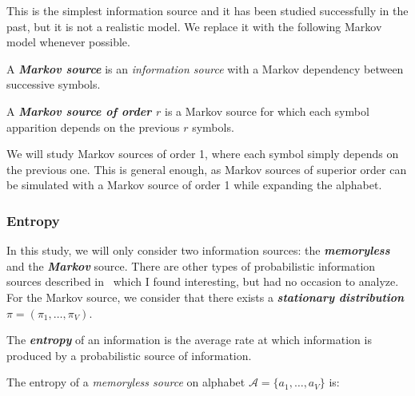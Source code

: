 \begin{rmk}
    \label{rmk:memoryless}
    This is the simplest information source and it has been 
    studied successfully in the past, but it is not a realistic 
    model. We replace it with the following Markov model whenever 
    possible.
\end{rmk}

\begin{df}
    \label{def:markov}
    A \emph{\bfseries Markov source} is an \emph{information source}
    with a Markov dependency between successive symbols.
\end{df}

\begin{df}
    \label{def:markovorder}
    A \emph{\bfseries Markov source of order $r$} is a Markov source
    for which each symbol apparition depends on the previous 
    $r$ symbols.
\end{df}

\begin{rmk}
    \label{rmk:markov2}
    We will study Markov sources of order 1, where each
    symbol simply depends on the previous one. This is 
    general enough, as Markov sources of superior order
    can be simulated with a Markov source of order 1 
    while expanding the alphabet.
\end{rmk}

\subsubsection{Entropy}

    In this study, we will only consider two information sources:
    the \emph{\bfseries memoryless} and the \emph{\bfseries Markov} source.
    There are other types of probabilistic information sources 
    described in~\cite{jacquet_analytic_2015} which I found interesting,
    but had no occasion to analyze.
    For the Markov source, we consider that there exists a 
    \emph{\bfseries stationary distribution} $\pi = (\pi_1,\dots,\pi_V)$.

    \begin{df}
        \label{def:entropy}
        The \emph{\bfseries entropy} of an information is the average
        rate at which information is produced by a probabilistic
        source of information.
    \end{df}

    \begin{prop}
        \label{prop:memorylessentropy}
        The entropy of a \emph{memoryless source} on 
        alphabet $\mathcal{A} = \{ a_1,\dots,a_V \}$ is:
    \end{prop}

